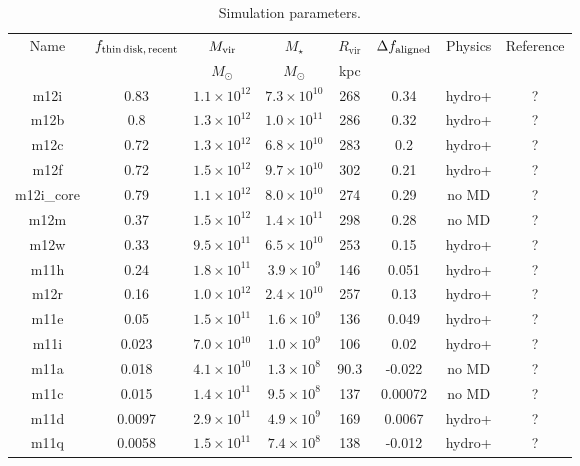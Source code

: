 \documentclass[fleqn,usenatbib]{mnras}
\begin{document}
\begin{table}
\caption{Simulation parameters.}
\begin{tabular}{cccccccc}
\hline
Name  &  $f_{\rm thin\,disk,\,recent}$  & $M_{\rm vir}$  &  $M_\star$  &  $R_{\textrm{vir}}$  &  $\Delta f_{\rm aligned}$  &  Physics  &  Reference  \\
  &   & $M_\odot$  & $M_\odot$  &  kpc  &  &  &  \\
 \hline
m12i  &  0.83  &  $1.1\times10^{12}$  &  $7.3\times10^{10}$  &  268  &  0.34  &  hydro+  &  ?    \\
m12b  &  0.8  &   $1.3\times10^{12}$  &  $1.0\times10^{11}$  &  286  &  0.32  &  hydro+  &  ?    \\
m12c  &  0.72  &   $1.3\times10^{12}$  &  $6.8\times10^{10}$  &  283  &  0.2  &  hydro+  &  ?    \\
m12f  &  0.72  &   $1.5\times10^{12}$  &  $9.7\times10^{10}$  &  302  &  0.21  &  hydro+  &  ?    \\
m12i\_core  &    0.79  &  $1.1\times10^{12}$  &  $8.0\times10^{10}$  &  274  &  0.29  &  no MD  &  ? \\m12m  &  0.37  &  $1.5\times10^{12}$  &  $1.4\times10^{11}$  &  298  &  0.28  &  no MD  &  ?    \\
 m12w  &  0.33  &  $9.5\times10^{11}$  &  $6.5\times10^{10}$  &  253  &  0.15  &  hydro+  &  ?    \\
m11h  &  0.24  &  $1.8\times10^{11}$  &  $3.9\times10^{9}$  &  146  &  0.051  &  hydro+  &  ?    \\
m12r  &  0.16  &   $1.0\times10^{12}$  &  $2.4\times10^{10}$  &  257  &  0.13  &  hydro+  &  ?    \\
m11e  &  0.05  &   $1.5\times10^{11}$  &  $1.6\times10^{9}$  &  136  &  0.049  &  hydro+  &  ?    \\
m11i  &  0.023  &  $7.0\times10^{10}$  &  $1.0\times10^{9}$  &  106  &  0.02  &  hydro+  &  ?    \\
m11a  &  0.018  &  $4.1\times10^{10}$  &  $1.3\times10^{8}$  &  90.3  &  -0.022  &  no MD  &  ?    \\
m11c  &  0.015  &  $1.4\times10^{11}$  &  $9.5\times10^{8}$  &  137  &  0.00072  &  no MD  &  ?    \\
m11d  &  0.0097  & $2.9\times10^{11}$  &  $4.9\times10^{9}$  &  169  &  0.0067  &  hydro+  &  ?    \\
m11q  &  0.0058  &  $1.5\times10^{11}$  &  $7.4\times10^{8}$  &  138  &  -0.012  &  hydro+  &  ?    \\

\end{tabular}
\end{table}
\end{document}
